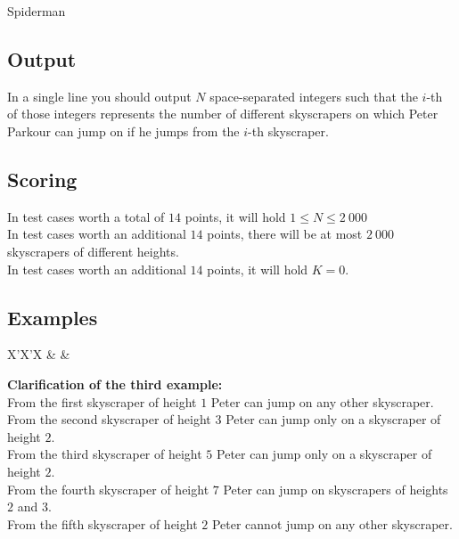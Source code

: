 \begin{statement}[
  problempoints=70,
  timelimit=2 seconds,
  memorylimit=512 MiB,
]{Spiderman}
\subsection*{Output}
In a single line you should output $N$ space-separated integers such that the
$i$-th of those integers represents the number of different skyscrapers on
which Peter Parkour can jump on if he jumps from the $i$-th skyscraper.

\subsection*{Scoring}
In test cases worth a total of $14$ points, it will hold $1 \le N \le 2\ 000$\\
In test cases worth an additional $14$ points, there will be at most $2\ 000$
skyscrapers of different heights. \\
In test cases worth an additional $14$ points, it will hold $K = 0$.

\subsection*{Examples}
\begin{tabularx}{\textwidth}{X'X'X}
 &
 &
\end{tabularx}

\textbf{Clarification of the third example:}\\
From the first skyscraper of height $1$ Peter can jump on any other skyscraper.\\
From the second skyscraper of height $3$ Peter can jump only on a skyscraper of  height $2$.\\
From the third skyscraper of height $5$ Peter can jump only on a skyscraper of height $2$.\\
From the fourth skyscraper of height $7$ Peter can jump on skyscrapers of heights $2$ and $3$.\\
From the fifth skyscraper of height $2$ Peter cannot jump on any other skyscraper.

\end{statement}

